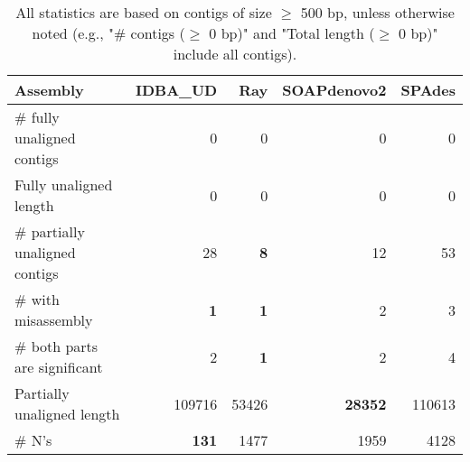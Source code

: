 \documentclass[12pt,a4paper]{article}
\begin{document}
\begin{table}[ht]
\begin{center}
\caption{All statistics are based on contigs of size $\geq$ 500 bp, unless otherwise noted (e.g., "\# contigs ($\geq$ 0 bp)" and "Total length ($\geq$ 0 bp)" include all contigs).}
\begin{tabular}{|l*{4}{|r}|}
\hline
Assembly & IDBA\_UD & Ray & SOAPdenovo2 & SPAdes \\ \hline
\# fully unaligned contigs & 0 & 0 & 0 & 0 \\ \hline
Fully unaligned length & 0 & 0 & 0 & 0 \\ \hline
\# partially unaligned contigs & 28 & {\bf 8} & 12 & 53 \\ \hline
\hspace{5mm}\# with misassembly & {\bf 1} & {\bf 1} & 2 & 3 \\ \hline
\hspace{5mm}\# both parts are significant & 2 & {\bf 1} & 2 & 4 \\ \hline
Partially unaligned length & 109716 & 53426 & {\bf 28352} & 110613 \\ \hline
\# N's & {\bf 131} & 1477 & 1959 & 4128 \\ \hline
\end{tabular}
\end{center}
\end{table}
\end{document}
